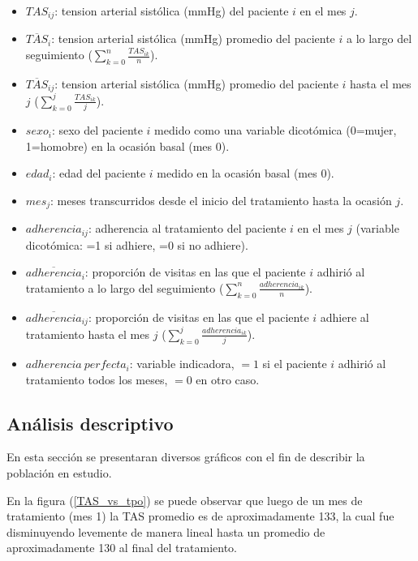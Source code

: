 \documentclass[spanish]{article}
\numberwithin{figure}{subsection}
\numberwithin{equation}{subsection}
\numberwithin{table}{subsection}
\begin{document}
\begin{itemize}
	\item $TAS_{ij}$: tension arterial sistólica (mmHg) del paciente $i$ en el
	mes $j$.
	\item $\overline{TAS}_{i}$: tension arterial sistólica (mmHg) promedio del
	paciente $i$ a lo largo del seguimiento ($\sum_{k=0}^n \frac{TAS_{ik}}{n}$).
	\item $\overline{TAS}_{ij}$: tension arterial sistólica (mmHg) promedio del
	paciente $i$ hasta el mes $j$ ($\sum_{k=0}^j \frac{TAS_{ik}}{j}$).
	\item $sexo_i$: sexo del paciente $i$ medido como una variable dicotómica
	(0=mujer, 1=homobre) en la ocasión basal (mes 0).
	\item $edad_i$: edad del paciente $i$ medido en la ocasión basal (mes 0).
	\item $mes_j$: meses transcurridos desde el inicio del tratamiento hasta la
	ocasión $j$.
	\item $adherencia_{ij}$: adherencia al tratamiento del paciente $i$ en el
	mes $j$ (variable dicotómica: =1 si adhiere, =0 si no adhiere).
	\item $\overline{adherencia}_i$: proporción de visitas en las que el
	paciente $i$ adhirió al tratamiento a lo largo del seguimiento
	($\sum_{k=0}^n \frac{adherencia_{ik}}{n}$).
	\item $\overline{adherencia}_{ij}$: proporción de visitas en las que el
	paciente $i$ adhiere al tratamiento hasta el mes $j$ ($\sum_{k=0}^j
	\frac{adherencia_{ik}}{j}$).
	\item $adherencia\ perfecta_i$: variable indicadora, $=1$ si el paciente
	$i$ adhirió al tratamiento todos los meses, $=0$ en otro caso.
\end{itemize}

\subsection{Análisis descriptivo}

En esta sección se presentaran diversos gráficos con el fin de describir la
población en estudio.

En la figura (\ref{TAS_vs_tpo}) se puede observar que luego de un mes de
tratamiento (mes 1) la TAS promedio es de aproximadamente 133, la cual fue
disminuyendo levemente de manera lineal hasta un promedio de aproximadamente 130
al final del tratamiento.
\end{document}
